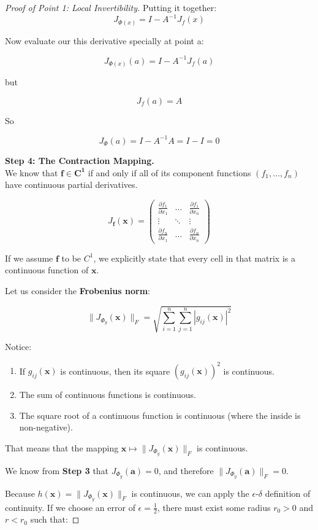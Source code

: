 \documentclass{article}
\begin{document}
\begin{proof}[Proof of Point 1: Local Invertibility]
Putting it together:
\[
    J_{\Phi(x)}=I - A^{-1} J_f(x)
\]

Now evaluate our this derivative specially at point a:

\[
J_{\Phi(x)}(a) = I - A^{-1} J_f(a)
\]

but

\[
J_f(a) = A
\]

So

\[
J_{\Phi}(a) = I - A^{-1}A = I - I = 0
\]

\textbf{Step 4: The Contraction Mapping.} \\
We know that $\mathbf{f \in C^1}$ if and only if all of its component functions $(f_1, \dots, f_n)$ have continuous partial derivatives.

$$J_{\mathbf{f}}(\mathbf{x}) = \begin{pmatrix}
\frac{\partial f_1}{\partial x_1} & \dots & \frac{\partial f_1}{\partial x_n} \\
\vdots & \ddots & \vdots \\
\frac{\partial f_n}{\partial x_1} & \dots & \frac{\partial f_n}{\partial x_n}
\end{pmatrix}$$

If we assume $\mathbf{f}$ to be $C^1$, we explicitly state that every cell in that matrix is a continuous function of $\mathbf{x}$.

Let us consider the \textbf{Frobenius norm}:

$$\|J_{\Phi_y}(\mathbf{x})\|_F = \sqrt{\sum_{i=1}^n \sum_{j=1}^n |g_{ij}(\mathbf{x})|^2}$$

Notice:
\begin{enumerate}
    \item If $g_{ij}(\mathbf{x})$ is continuous, then its square $(g_{ij}(\mathbf{x}))^2$ is continuous.
    \item The sum of continuous functions is continuous.
    \item The square root of a continuous function is continuous (where the inside is non-negative).
\end{enumerate}

That means that the mapping $\mathbf{x} \mapsto \|J_{\Phi_y}(\mathbf{x})\|_F$ is continuous.

We know from \textbf{Step 3} that $J_{\Phi_y}(\mathbf{a}) = 0$, and therefore $\|J_{\Phi_y}(\mathbf{a})\|_F = 0$.

Because $h(\mathbf{x}) = \|J_{\Phi_y}(\mathbf{x})\|_F$ is continuous, we can apply the $\epsilon$-$\delta$ definition of continuity. If we choose an error of $\epsilon = \frac{1}{2}$, there must exist some radius $r_0 > 0$ and $r < r_0$ such that:


\end{proof}
\end{document}
